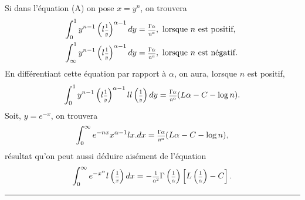 \documentclass[oneside, 12 pt, leqno]{memoir}
\let\oldfrac\frac
\def\frac#1#2{\mathchoice{\text{\scalebox{.83}{${\oldfrac{#1}{#2}}$}}}{\text{\scalebox{.83}{${\displaystyle\oldfrac{#1}{#2}}$}}}{\genfrac{}{}{}{2}{#1}{#2}}{\genfrac{}{}{}{3}{#1}{#2}}}
\begin{document}
Si dans l'équation (A) on pose \(x=y^{n}\), on trouvera
\[\begin{aligned}
& \int_{0}^{1} y^{n-1}\left(l \frac{1}{y}\right)^{\alpha-1} d y=\frac{\Gamma \alpha}{n^{\alpha}}, \text { lorsque } n \text { est positif, } \\
& \int_{\infty}^{1} y^{n-1}\left(l \frac{1}{y}\right)^{\alpha-1} d y=\frac{\Gamma \alpha}{n^{\alpha}}, \text { lorsque } n \text { est négatif. }
\end{aligned}\]
En différentiant cette équation par rapport à \(\alpha\), on aura, lorsque \(n\) est positif,
\[\int_{0}^{1} y^{n-1}\left(l \frac{1}{y}\right)^{\alpha-1} l l\left(\frac{1}{y}\right) d y=\frac{\Gamma \alpha}{n^{\alpha}}(L \alpha-C-\log n).\]
Soit, \(y=e^{-x}\), on trouvera
\[\int_{0}^{\infty} e^{-n x} x^{\alpha-1} l x . d x=\frac{\Gamma \alpha}{n^{\alpha}}(L \alpha-C-\log n),\]
résultat qu'on peut aussi déduire aisément de l'équation
\[\int_{0}^{\infty} e^{-x^{\alpha}} l \left(\frac{1}{x}\right) d x=-\frac{1}{\alpha^{2}} \Gamma\left(\frac{1}{\alpha}\right)\left[L\left(\frac{1}{\alpha}\right)-C\right].\]
\begin{center} \rule{2in}{0.1pt} \end{center}
\end{document}
